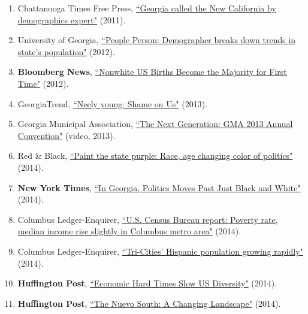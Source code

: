 \begin{enumerate}
\itemsep-0.4em 
    \item Chattanooga Times Free Press, \href{http://www.timesfreepress.com/news/news/story/2011/nov/25/georgia-called-the-new-california/64755/}{``Georgia called the New       California by demographics expert"} (2011).
    \item University of Georgia, \href{http://columns.uga.edu/news/fulltext/trends-in-states-population/}{``People Person: Demographer breaks down trends in state's             population"} (2012).
    \item \textbf{Bloomberg News}, \href{http://www.bloomberg.com/news/articles/2012-05-17/non-white-u-s-births-become-the-majority-for-first-time}{``Nonwhite US Births         Become the Majority for First Time"} (2012).
    \item GeorgiaTrend, \href{http://www.georgiatrend.com/July-2013/Neely-Young-Shame-On-Us/}{``Neely young: Shame on Us"} (2013).
    \item Georgia Municipal Association, \href{https://www.youtube.com/watch?v=3GDrBl50JwE\&list=UUPaBGMwiAgDLI6eM0pSnWRA}{``The Next Generation: GMA 2013 Annual                Convention"} (video, 2013).
    \item Red \& Black, \href{http://www.redandblack.com/uganews/paint-the-state-purple-race-age-changing-color-of-politics/article_8e3dddac-49c0-11e4-8f4c-0017a43b2370.html     }{``Paint the state purple: Race, age changing color of politics"} (2014).
    \item \textbf{New York Times}, \href{http://www.nytimes.com/2014/09/19/us/politics/as-georgias-population-changes-its-politics-begin-to-follow.html?_r=0}{``In Georgia,      Politics Moves Past Just Black and White"} (2014). 
    \item Columbus Ledger-Enquirer, \href{http://www.ledger-enquirer.com/news/business/article29305372.html}{``U.S. Census Bureau report: Poverty rate, median income rise       slightly in Columbus metro area"} (2014).
    \item Columbus Ledger-Enquirer, \href{http://www.ledger-enquirer.com/news/local/article29346202.html}{``Tri-Cities' Hispanic population growing rapidly"} (2014).
    \item \textbf{Huffington Post}, \href{http://www.huffingtonpost.com/2014/07/09/us-diversity-economy_n_5570607.html}{``Economic Hard Times Slow US Diversity"} (2014).
    \item \textbf{Huffington Post}, \href{http://www.huffingtonpost.com/eduardo-diaz/the-nuevo-south-a-changin_b_5586045.html}{``The Nuevo South: A Changing Landscape"}        (2014).

\end{enumerate}
